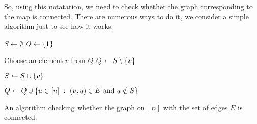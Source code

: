 So, using this notatation, we need to check whether the graph corresponding to
the map is connected.
There are numerous ways to do it, we consider a simple algorithm just to see how
it works.
\begin{algorithm}
  \begin{algorithmic}[1]
      \State $S \gets \emptyset$
      \State $Q \gets \set{1}$

      \label{algorithm:connectivity-cycle}
        \State Choose an element $v$ from $Q$
        \State $Q \gets S \setminus \set{v}$

        \State $S \gets S \cup \set{v}$

        \State $Q \gets Q \cup
          \set[{(v, u) \in E \text{ and } u \notin S}]{u \in \range{n}}$
      \EndWhile
      \label{line:connectivity-last}
      \State {}
    \EndFunction
  \end{algorithmic}
  \caption{An algorithm checking whether the graph on $[n]$ with the set of
  edges $E$ is connected.}
  \label{algorithm:connectivity}
\end{algorithm}

